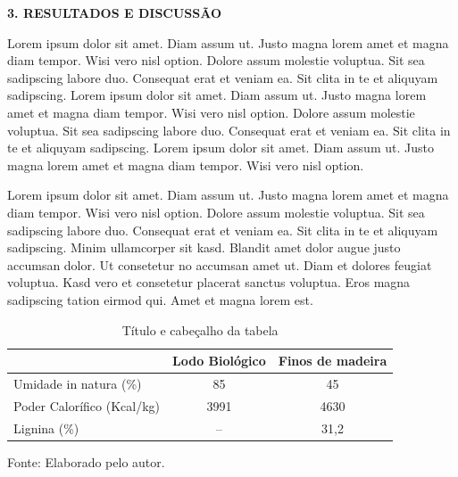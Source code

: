 \documentclass[final]{beamer}
\begin{document}
\begin{frame}[t]
\begin{columns}[t,totalwidth=0.6\paperwidth]
\begin{column}{0.45\paperwidth}
      \vspace{1.3cm}


    \vspace{1em}
    {\large\bfseries 3. RESULTADOS E DISCUSSÃO}\par
    \justifying
    \vspace{1.3cm}
    	 Lorem ipsum dolor sit amet. Diam assum ut. Justo magna lorem amet et magna diam tempor. Wisi vero nisl option. Dolore assum molestie voluptua. Sit sea sadipscing labore duo. Consequat erat et veniam ea. Sit clita in te et aliquyam sadipscing. 
	 Lorem ipsum dolor sit amet. Diam assum ut. Justo magna lorem amet et magna diam tempor. Wisi vero nisl option. Dolore assum molestie voluptua. Sit sea sadipscing labore duo. Consequat erat et veniam ea. Sit clita in te et aliquyam sadipscing. 
	 Lorem ipsum dolor sit amet. Diam assum ut. Justo magna lorem amet et magna diam tempor. Wisi vero nisl option.

  Lorem ipsum dolor sit amet. Diam assum ut. Justo magna lorem amet et magna diam tempor. Wisi vero nisl option. Dolore assum molestie voluptua. Sit sea sadipscing labore duo. Consequat erat et veniam ea. Sit clita in te et aliquyam sadipscing. Minim ullamcorper sit kasd. Blandit amet dolor augue justo accumsan dolor. Ut consetetur no accumsan amet ut. Diam et dolores feugiat voluptua. Kasd vero et consetetur placerat sanctus voluptua. Eros magna sadipscing tation eirmod qui. Amet et magna lorem est.



    \vspace{1cm}
    \centering
    
\begin{table}[H]
    \caption{Título e cabeçalho da tabela}
    \setlength{\tabcolsep}{8pt}
    \renewcommand{\arraystretch}{1.25}
    \centering
    \begin{tabular}{>{\RaggedRight}p{8.2cm}cc}
      \toprule
      & \textbf{Lodo Biológico} & \textbf{Finos de madeira}\\
      \midrule
      Umidade in natura (\%)      & 85   & 45   \\
      Poder Calorífico (Kcal/kg)  & 3991 & 4630 \\
      Lignina (\%)                & --   & 31{,}2\\
      \bottomrule
    \end{tabular}
    \par\smallskip
    \raggedright\footnotesize 
    \centering Fonte: Elaborado pelo autor. %
    \normalsize
    \label{tab:caracteristicas}
\end{table}



\end{column}
\end{columns}
\end{frame}
\end{document}
